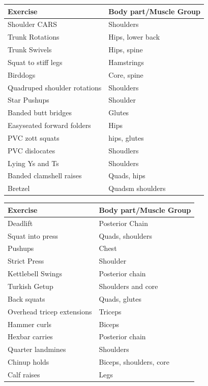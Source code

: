 \documentclass[
  oneside]{book}
\begin{document}
\captionsetup[table]{labelformat=empty,skip=1pt}
\begin{longtable}{ll}
\toprule
\textbf{Exercise} & \textbf{Body part/Muscle Group} \\ 
\midrule
Shoulder CARS & Shoulders \\ 
Trunk Rotations & Hips, lower back \\ 
Trunk Swivels & Hips, spine \\ 
Squat to stiff legs & Hamstrings \\ 
Birddogs & Core, spine \\ 
Quadruped shoulder rotations & Shoulders \\ 
Star Pushups & Shoulder \\ 
Banded butt bridges & Glutes \\ 
Easyseated forward folders & Hips \\ 
PVC zott squats & hips, glutes \\ 
PVC dislocates & Shoudlers \\ 
Lying Ys and Ts & Shoulders \\ 
Banded clamshell raises & Quads, hips \\ 
Bretzel & Quadsm shoulders \\ 
 \bottomrule
\end{longtable}

\captionsetup[table]{labelformat=empty,skip=1pt}
\begin{longtable}{ll}
\toprule
\textbf{Exercise} & \textbf{Body part/Muscle Group} \\ 
\midrule
Deadlift & Posterior Chain \\ 
Squat into press & Quads, shoulders \\ 
Pushups & Chest \\ 
Strict Press & Shoulder \\ 
Kettlebell Swings & Posterior chain \\ 
Turkish Getup & Shoulders and core \\ 
Back squats & Quads, glutes \\ 
Overhead tricep extensions & Triceps \\ 
Hammer curls & Biceps \\ 
Hexbar carries & Posterior chain \\ 
Quarter landmines & Shoulders \\ 
Chinup holds & Biceps, shoulders, core \\ 
Calf raises & Legs \\ 
 \bottomrule
\end{longtable}
\end{document}
